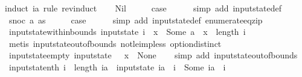 \begin{isabellebody}
%
\isatagproof
{}\isamarkupfalse%
{\isacharparenleft}induct\ ia\ rule{\isacharcolon}\ rev{\isacharunderscore}induct{\isacharparenright}\isanewline
\ \ \isamarkupfalse%
\ Nil\isanewline
\ \ \isamarkupfalse%
\ \isamarkupfalse%
\ {\isacharquery}case\isanewline
\ \ \ \ \isamarkupfalse%
\ {\isacharparenleft}simp\ add{\isacharcolon}\ input{}state{\isacharunderscore}def{\isacharparenright}\isanewline
{}\isamarkupfalse%
\isanewline
\ \ \isamarkupfalse%
\ {\isacharparenleft}snoc\ a\ as{\isacharparenright}\isanewline
\ \ \isamarkupfalse%
\ \isamarkupfalse%
\ {\isacharquery}case\isanewline
\ \ \ \ \isamarkupfalse%
\ {\isacharparenleft}simp\ add{\isacharcolon}\ input{}state{\isacharunderscore}def\ enumerate{\isacharunderscore}eq{\isacharunderscore}zip{\isacharparenright}\isanewline
{}\isamarkupfalse%
%
\endisatagproof
{\isafoldproof}%
%
\isadelimproof
\isanewline
%
\endisadelimproof
\isanewline
{}\isamarkupfalse%
\ input{}state{\isacharunderscore}within{\isacharunderscore}bounds{\isacharcolon}\ {\isachardoublequoteopen}input{}state\ i\ {\isachardollar}\ x\ {\isacharequal}\ Some\ a\ {\isasymLongrightarrow}\ x\ {\isacharless}\ length\ i{\isachardoublequoteclose}\isanewline
%
\isadelimproof
\ \ %
\endisadelimproof
%
\isatagproof
{}\isamarkupfalse%
\ {\isacharparenleft}metis\ input{}state{\isacharunderscore}out{\isacharunderscore}of{\isacharunderscore}bounds\ not{\isacharunderscore}le{\isacharunderscore}imp{\isacharunderscore}less\ option{\isachardot}distinct{\isacharparenleft}{}{\isacharparenright}{\isacharparenright}%
\endisatagproof
{\isafoldproof}%
%
\isadelimproof
\isanewline
%
\endisadelimproof
\isanewline
{}\isamarkupfalse%
\ input{}state{\isacharunderscore}empty{\isacharcolon}\ {\isachardoublequoteopen}input{}state\ {\isacharbrackleft}{\isacharbrackright}\ {\isachardollar}\ x{}\ {\isacharequal}\ None{\isachardoublequoteclose}\isanewline
%
\isadelimproof
\ \ %
\endisadelimproof
%
\isatagproof
{}\isamarkupfalse%
\ {\isacharparenleft}simp\ add{\isacharcolon}\ input{}state{\isacharunderscore}out{\isacharunderscore}of{\isacharunderscore}bounds{\isacharparenright}%
\endisatagproof
{\isafoldproof}%
%
\isadelimproof
\isanewline
%
\endisadelimproof
\isanewline
{}\isamarkupfalse%
\ input{}state{\isacharunderscore}nth{\isacharcolon}\ {\isachardoublequoteopen}i\ {\isacharless}\ length\ ia\ {\isasymLongrightarrow}\ input{}state\ ia\ {\isachardollar}\ i\ {\isacharequal}\ Some\ {\isacharparenleft}ia\ {\isacharbang}\ i{\isacharparenright}{\isachardoublequoteclose}\isanewline

\end{isabellebody}
